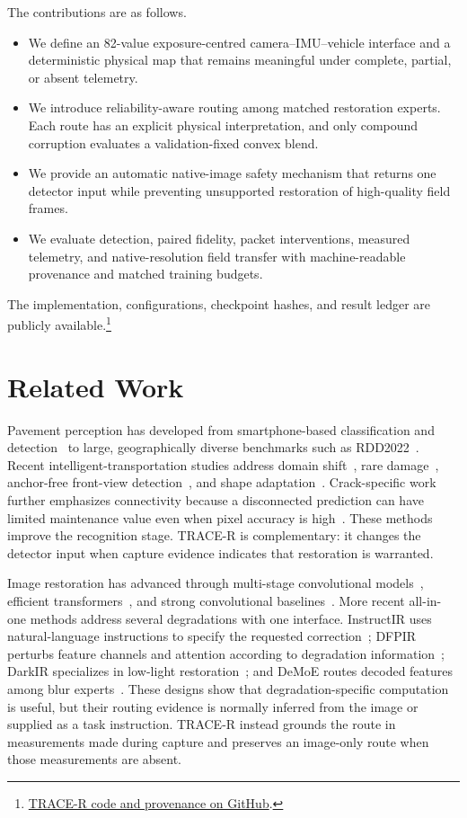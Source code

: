 \documentclass[journal]{IEEEtran}
\begin{document}
The contributions are as follows.
\begin{itemize}
    \item We define an 82-value exposure-centred camera--IMU--vehicle interface and a deterministic physical map that remains meaningful under complete, partial, or absent telemetry.
    \item We introduce reliability-aware routing among matched restoration experts. Each route has an explicit physical interpretation, and only compound corruption evaluates a validation-fixed convex blend.
    \item We provide an automatic native-image safety mechanism that returns one detector input while preventing unsupported restoration of high-quality field frames.
    \item We evaluate detection, paired fidelity, packet interventions, measured telemetry, and native-resolution field transfer with machine-readable provenance and matched training budgets.
\end{itemize}
The implementation, configurations, checkpoint hashes, and result ledger are publicly available.\footnote{\href{https://github.com/AmirNetwork/rmrnet-restoration/tree/trace-r-journal/TRACE_R_journal_release}{TRACE-R code and provenance on GitHub}.}

\section{Related Work}
Pavement perception has developed from smartphone-based classification and detection~\cite{maeda2018road} to large, geographically diverse benchmarks such as RDD2022~\cite{arya2022rdd2022}. Recent intelligent-transportation studies address domain shift~\cite{lin2023dardd,liu2022domaincrack}, rare damage~\cite{su2022fsrdd}, anchor-free front-view detection~\cite{li2024yoloxrdd}, and shape adaptation~\cite{zhang2024shapeadaptation}. Crack-specific work further emphasizes connectivity because a disconnected prediction can have limited maintenance value even when pixel accuracy is high~\cite{jing2025topologycrack}. These methods improve the recognition stage. TRACE-R is complementary: it changes the detector input when capture evidence indicates that restoration is warranted.

Image restoration has advanced through multi-stage convolutional models~\cite{zamir2021mprnet}, efficient transformers~\cite{zamir2022restormer,wang2022uformer,kong2023fftformer}, and strong convolutional baselines~\cite{chen2022nafnet}. More recent all-in-one methods address several degradations with one interface. InstructIR uses natural-language instructions to specify the requested correction~\cite{conde2024instructir}; DFPIR perturbs feature channels and attention according to degradation information~\cite{tian2025dfpir}; DarkIR specializes in low-light restoration~\cite{feijoo2025darkir}; and DeMoE routes decoded features among blur experts~\cite{feijoo2025demoe}. These designs show that degradation-specific computation is useful, but their routing evidence is normally inferred from the image or supplied as a task instruction. TRACE-R instead grounds the route in measurements made during capture and preserves an image-only route when those measurements are absent.
\end{document}
